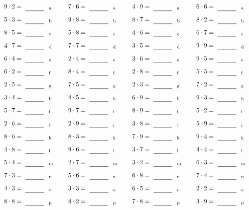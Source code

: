 \documentclass
[
  draft    = true,
  fontsize = 11pt,
  parskip  = half-
]
{scrartcl}
\begin{document}
\par\vfill\par
\begin{align*}
    \pline{9\cdot2}&=\rline{a}
  & \pline{7\cdot6}&=\rline{a}
  & \pline{4\cdot9}&=\rline{a}
  & \pline{6\cdot6}&=\rline{a} \\[1ex]
    \pline{5\cdot3}&=\rline{b}
  & \pline{9\cdot8}&=\rline{b}
  & \pline{8\cdot7}&=\rline{b}
  & \pline{8\cdot2}&=\rline{b} \\[1ex]
    \pline{8\cdot5}&=\rline{c}
  & \pline{5\cdot8}&=\rline{c}
  & \pline{4\cdot6}&=\rline{c}
  & \pline{6\cdot7}&=\rline{c} \\[1ex]
    \pline{4\cdot7}&=\rline{d}
  & \pline{7\cdot7}&=\rline{d}
  & \pline{3\cdot5}&=\rline{d}
  & \pline{9\cdot9}&=\rline{d} \\[1ex]
    \pline{6\cdot4}&=\rline{e}
  & \pline{2\cdot4}&=\rline{e}
  & \pline{3\cdot6}&=\rline{e}
  & \pline{9\cdot5}&=\rline{e} \\[1ex]
    \pline{6\cdot2}&=\rline{f}
  & \pline{8\cdot4}&=\rline{f}
  & \pline{2\cdot8}&=\rline{f}
  & \pline{5\cdot5}&=\rline{f} \\[1ex]
    \pline{2\cdot5}&=\rline{g}
  & \pline{7\cdot5}&=\rline{g}
  & \pline{2\cdot3}&=\rline{g}
  & \pline{7\cdot2}&=\rline{g} \\[1ex]
    \pline{3\cdot4}&=\rline{h}
  & \pline{4\cdot5}&=\rline{h}
  & \pline{6\cdot9}&=\rline{h}
  & \pline{9\cdot3}&=\rline{h} \\[1ex]
    \pline{5\cdot7}&=\rline{i}
  & \pline{9\cdot7}&=\rline{i}
  & \pline{8\cdot9}&=\rline{i}
  & \pline{5\cdot2}&=\rline{i} \\[1ex]
    \pline{2\cdot6}&=\rline{j}
  & \pline{2\cdot9}&=\rline{j}
  & \pline{3\cdot8}&=\rline{j}
  & \pline{5\cdot9}&=\rline{j} \\[1ex]
    \pline{8\cdot6}&=\rline{k}
  & \pline{8\cdot3}&=\rline{k}
  & \pline{7\cdot9}&=\rline{k}
  & \pline{9\cdot4}&=\rline{k} \\[1ex]
    \pline{4\cdot8}&=\rline{l}
  & \pline{9\cdot6}&=\rline{l}
  & \pline{3\cdot7}&=\rline{l}
  & \pline{4\cdot4}&=\rline{l} \\[1ex]
    \pline{5\cdot4}&=\rline{m}
  & \pline{2\cdot7}&=\rline{m}
  & \pline{3\cdot2}&=\rline{m}
  & \pline{6\cdot3}&=\rline{m} \\[1ex]
    \pline{7\cdot3}&=\rline{n}
  & \pline{5\cdot6}&=\rline{n}
  & \pline{6\cdot8}&=\rline{n}
  & \pline{7\cdot4}&=\rline{n} \\[1ex]
    \pline{4\cdot3}&=\rline{o}
  & \pline{3\cdot3}&=\rline{o}
  & \pline{6\cdot5}&=\rline{o}
  & \pline{2\cdot2}&=\rline{o} \\[1ex]
    \pline{8\cdot8}&=\rline{p}
  & \pline{4\cdot2}&=\rline{p}
  & \pline{7\cdot8}&=\rline{p}
  & \pline{3\cdot9}&=\rline{p}
\end{align*}
\end{document}
